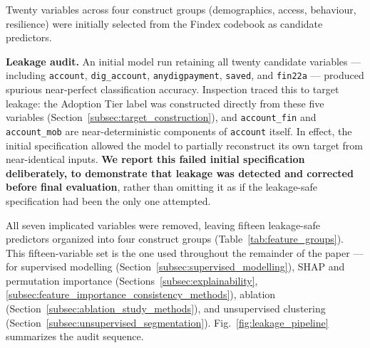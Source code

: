 \documentclass[conference]{IEEEtran}
\begin{document}
Twenty variables across four construct groups (demographics, access,
behaviour, resilience) were initially selected from the Findex codebook as
candidate predictors.

\textbf{Leakage audit.} An initial model run retaining all twenty
candidate variables --- including \texttt{account}, \texttt{dig\_account},
\texttt{anydigpayment}, \texttt{saved}, and \texttt{fin22a} --- produced
spurious near-perfect classification accuracy. Inspection traced this to
target leakage: the Adoption Tier label was constructed directly from
these five variables (Section~\ref{subsec:target_construction}), and \texttt{account\_fin} and
\texttt{account\_mob} are near-deterministic components of
\texttt{account} itself. In effect, the initial specification allowed the
model to partially reconstruct its own target from near-identical inputs.
\textbf{We report this failed initial specification deliberately, to
demonstrate that leakage was detected and corrected before final
evaluation}, rather than omitting it as if the leakage-safe specification
had been the only one attempted.

All seven implicated variables were removed, leaving fifteen leakage-safe
predictors organized into four construct groups (Table~\ref{tab:feature_groups}). This
fifteen-variable set is the one used throughout the remainder of the
paper --- for supervised modelling (Section~\ref{subsec:supervised_modelling}), SHAP and permutation
importance (Sections~\ref{subsec:explainability}, \ref{subsec:feature_importance_consistency_methods}), ablation (Section~\ref{subsec:ablation_study_methods}), and
unsupervised clustering (Section~\ref{subsec:unsupervised_segmentation}). Fig.~\ref{fig:leakage_pipeline}
summarizes the audit sequence.
\end{document}

